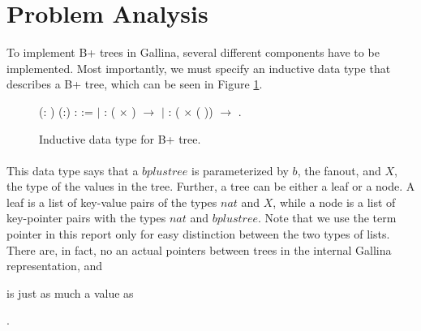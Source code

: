 \section{Problem Analysis}
\label{sec:ProblemAnalysis}
To implement B+ trees in Gallina, several different components have to be implemented. Most importantly, we must specify an inductive data type that describes a B+ tree, which can be seen in Figure \ref{fig:inductive_data_type}.

\begin{figure}
\centering
\begin{coqdoccode}
  (: ) (:) :  :=\coqdoceol
\coqdocindent{1.00em}
\ensuremath{|}  :  ( \ensuremath{\times} ) \ensuremath{\rightarrow}   \coqdoceol
\coqdocindent{1.00em}
\ensuremath{|}  :  ( \ensuremath{\times} (  )) \ensuremath{\rightarrow}   .\coqdoceol
\end{coqdoccode}
\caption{Inductive data type for B+ tree.}
\label{fig:inductive_data_type}
\end{figure}

\paragraph{}
This data type says that a $bplustree$ is parameterized by $b$, the fanout, and $X$, the type of the values in the tree. Further, a tree can be either a leaf or a node. A leaf is a list of key-value pairs of the types $nat$ and $X$, while a node is a list of key-pointer pairs with the types $nat$ and $bplustree$. Note that we use the term pointer in this report only for easy distinction between the two types of lists. There are, in fact, no an actual pointers between trees in the internal Gallina representation, and \begin{coqdoccode}  \end{coqdoccode} is just as much a value as \begin{coqdoccode} \end{coqdoccode}.

